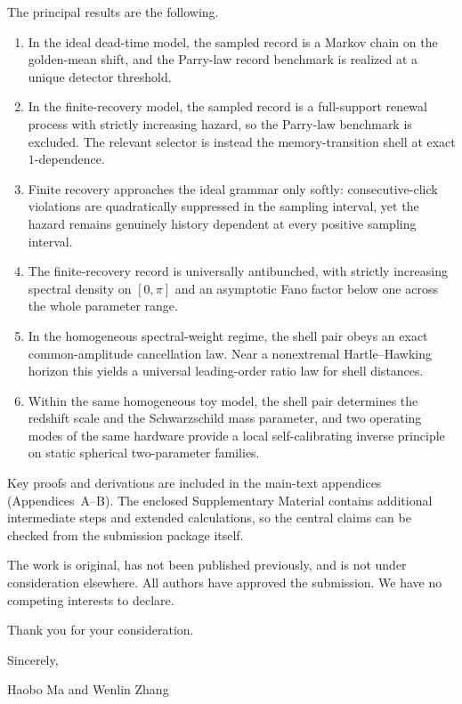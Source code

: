 \documentclass[11pt]{article}
\begin{document}
The principal results are the following.
\begin{enumerate}
\item In the ideal dead-time model, the sampled record is a Markov chain on the golden-mean shift, and the Parry-law record benchmark is realized at a unique detector threshold.
\item In the finite-recovery model, the sampled record is a full-support renewal process with strictly increasing hazard, so the Parry-law benchmark is excluded. The relevant selector is instead the memory-transition shell at exact $1$-dependence.
\item Finite recovery approaches the ideal grammar only softly: consecutive-click violations are quadratically suppressed in the sampling interval, yet the hazard remains genuinely history dependent at every positive sampling interval.
\item The finite-recovery record is universally antibunched, with strictly increasing spectral density on $[0,\pi]$ and an asymptotic Fano factor below one across the whole parameter range.
\item In the homogeneous spectral-weight regime, the shell pair obeys an exact common-amplitude cancellation law. Near a nonextremal Hartle--Hawking horizon this yields a universal leading-order ratio law for shell distances.
\item Within the same homogeneous toy model, the shell pair determines the redshift scale and the Schwarzschild mass parameter, and two operating modes of the same hardware provide a local self-calibrating inverse principle on static spherical two-parameter families.
\end{enumerate}

Key proofs and derivations are included in the main-text appendices (Appendices~A--B). The enclosed Supplementary Material contains additional intermediate steps and extended calculations, so the central claims can be checked from the submission package itself.

The work is original, has not been published previously, and is not under consideration elsewhere. All authors have approved the submission. We have no competing interests to declare.

Thank you for your consideration.

Sincerely,

Haobo Ma and Wenlin Zhang
\end{document}
